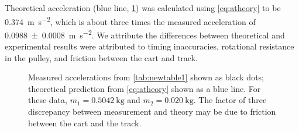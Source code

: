 \documentclass[reprint,amsmath,amssymb,aps]{revtex4-2}
\begin{document}

Theoretical acceleration (blue line, \cref{fig:results}) was calculated using \cref{eq:atheory} to be \qty{0.374}{\meter\per\second\squared}, which is about three times the measured acceleration of \qty{0.0988\pm0.0008}{\meter\per\second\squared}. We attribute the differences between theoretical and experimental results were attributed to timing inaccuracies, rotational resistance in the pulley, and friction between the cart and track.
\begin{figure}
\begin{center}

\end{center}
\caption{\label{fig:results} Measured accelerations from \cref{tab:newtable1} shown as black dots; theoretical prediction from \cref{eq:atheory} shown as a blue line. For these data, $m_1=\qty{0.5042}{\kilo\gram}$ and $m_2=\qty{0.020}{\kilo\gram}$. The factor of three discrepancy between measurement and theory may be due to friction between the cart and the track.} 
\end{figure}
\end{document}
